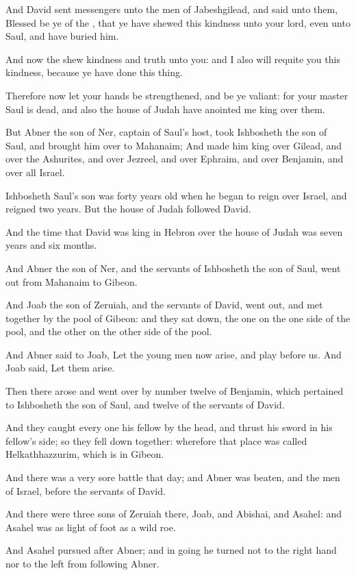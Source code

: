 \Verse And David sent messengers unto the men of Jabeshgilead, and said unto them, Blessed be ye of the \LORD, that ye have shewed this kindness unto your lord, even unto Saul, and have buried him.

\Verse And now the \LORD shew kindness and truth unto you: and I also will requite you this kindness, because ye have done this thing.

\Verse Therefore now let your hands be strengthened, and be ye valiant: for your master Saul is dead, and also the house of Judah have anointed me king over them.

\Verse But Abner the son of Ner, captain of Saul's host, took Ishbosheth the son of Saul, and brought him over to Mahanaim; \Verse And made him king over Gilead, and over the Ashurites, and over Jezreel, and over Ephraim, and over Benjamin, and over all Israel.

\Verse Ishbosheth Saul's son was forty years old when he began to reign over Israel, and reigned two years. But the house of Judah followed David.

\Verse And the time that David was king in Hebron over the house of Judah was seven years and six months.

\Verse And Abner the son of Ner, and the servants of Ishbosheth the son of Saul, went out from Mahanaim to Gibeon.

\Verse And Joab the son of Zeruiah, and the servants of David, went out, and met together by the pool of Gibeon: and they sat down, the one on the one side of the pool, and the other on the other side of the pool.

\Verse And Abner said to Joab, Let the young men now arise, and play before us. And Joab said, Let them arise.

\Verse Then there arose and went over by number twelve of Benjamin, which pertained to Ishbosheth the son of Saul, and twelve of the servants of David.

\Verse And they caught every one his fellow by the head, and thrust his sword in his fellow's side; so they fell down together: wherefore that place was called Helkathhazzurim, which is in Gibeon.

\Verse And there was a very sore battle that day; and Abner was beaten, and the men of Israel, before the servants of David.

\Verse And there were three sons of Zeruiah there, Joab, and Abishai, and Asahel: and Asahel was as light of foot as a wild roe.

\Verse And Asahel pursued after Abner; and in going he turned not to the right hand nor to the left from following Abner.

